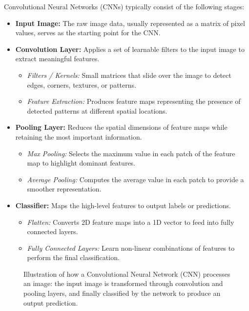Convolutional Neural Networks (CNNs) typically consist of the following stages:

\begin{itemize}
	\item \textbf{Input Image:} The raw image data, usually represented as a matrix of pixel values, serves as the starting point for the CNN.
	
	\item \textbf{Convolution Layer:} Applies a set of learnable filters to the input image to extract meaningful features.
	\begin{itemize}
		\item \textit{Filters / Kernels:} Small matrices that slide over the image to detect edges, corners, textures, or patterns.
		\item \textit{Feature Extraction:} Produces feature maps representing the presence of detected patterns at different spatial locations.
	\end{itemize}
	
	\item \textbf{Pooling Layer:} Reduces the spatial dimensions of feature maps while retaining the most important information.
	\begin{itemize}
		\item \textit{Max Pooling:} Selects the maximum value in each patch of the feature map to highlight dominant features.
		\item \textit{Average Pooling:} Computes the average value in each patch to provide a smoother representation.
	\end{itemize}
	
	\item \textbf{Classifier:} Maps the high-level features to output labels or predictions.
	\begin{itemize}
		\item \textit{Flatten:} Converts 2D feature maps into a 1D vector to feed into fully connected layers.
		\item \textit{Fully Connected Layers:} Learn non-linear combinations of features to perform the final classification.
	\end{itemize}
\end{itemize}

\begin{figure}[H]
	\centering
	
	\caption{Illustration of how a Convolutional Neural Network (CNN) processes an image: the input image is transformed through convolution and pooling layers, and finally classified by the network to produce an output prediction.}
\end{figure}


